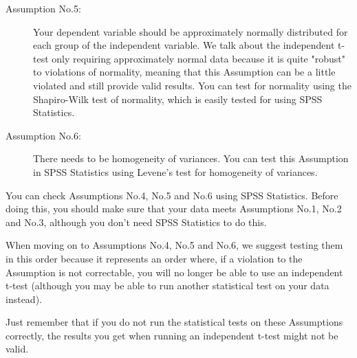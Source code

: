 \documentclass[]{article}
\begin{document}
\begin{description}
	\item[Assumption No.5:] Your dependent variable should be approximately normally distributed for each group of the independent variable. We talk about the independent t-test only requiring approximately normal data because it is quite "robust" to violations of normality, meaning that this Assumption can be a little violated and still provide valid results. You can test for normality using the Shapiro-Wilk test of normality, which is easily tested for using SPSS Statistics. 
	\item[Assumption No.6:] There needs to be homogeneity of variances. You can test this Assumption in SPSS Statistics using Levene’s test for homogeneity of variances. 
	
	
\end{description}
You can check Assumptions No.4, No.5 and No.6 using SPSS Statistics. Before doing this, you should make sure that your data meets Assumptions No.1, No.2 and No.3, although you don't need SPSS Statistics to do this. \\ \smallskip

\noindent When moving on to Assumptions No.4, No.5 and No.6, we suggest testing them in this order because it represents an order where, if a violation to the Assumption is not correctable, you will no longer be able to use an independent t-test (although you may be able to run another statistical test on your data instead).  \\ \smallskip

\noindent Just remember that if you do not run the statistical tests on these Assumptions correctly, the results you get when running an independent t-test might not be valid. \\ \smallskip

\end{document}
